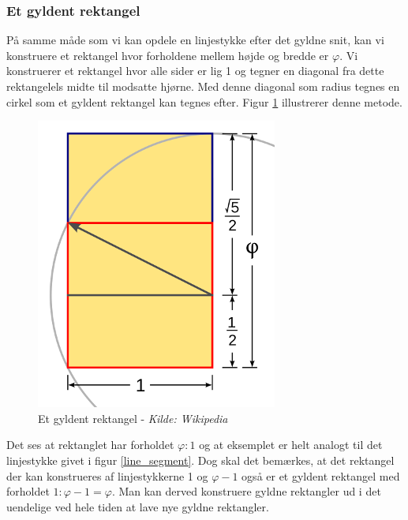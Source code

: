 {\subsubsection{Et gyldent rektangel}
På samme måde som vi kan opdele en linjestykke efter det gyldne snit,
kan vi konstruere et rektangel hvor forholdene mellem højde og bredde er
$\varphi$. Vi konstruerer et rektangel hvor alle sider er lig 1 og
tegner en diagonal fra dette rektangelels midte til modsatte hjørne. Med
denne diagonal som radius tegnes en cirkel som et gyldent rektangel kan
tegnes efter. Figur \ref{golden_rectangle} illustrerer denne metode.

\begin{figure}[h!]
	\begin{center}
		\includegraphics[scale=0.35,angle=0]{afsnit/baggrund/billeder/Golden_Rectangle_Construction}
	\end{center}
	\caption{Et gyldent rektangel - \emph{Kilde: Wikipedia}}
	\label{golden_rectangle}
\end{figure}
Det ses at rektanglet har forholdet $\varphi:1$ og at eksemplet er helt
analogt til det linjestykke givet i figur \ref{line_segment}. Dog skal
det bemærkes, at det rektangel der kan konstrueres af linjestykkerne 1
og $\varphi - 1$ også er et gyldent rektangel med forholdet $1:\varphi
-1 = \varphi$. Man kan derved konstruere gyldne rektangler ud i det
uendelige ved hele tiden at lave nye gyldne rektangler.

}
